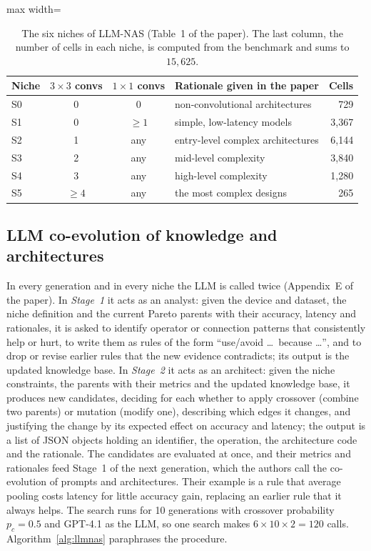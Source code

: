 \documentclass[preprint,12pt]{elsarticle}
\begin{document}
\begin{table}[h]\centering\small
\caption{The six niches of LLM-NAS (Table~1 of the paper). The last column, the number of cells in each niche, is computed from the benchmark and sums to $15{,}625$.}\label{tab:niches}
\begin{adjustbox}{max width=\linewidth}
\begin{tabular}{lccp{5.6cm}r}
\toprule
Niche & $3{\times}3$ convs & $1{\times}1$ convs & Rationale given in the paper & Cells \\
\midrule
S0 & 0 & 0 & non-convolutional architectures & 729 \\
S1 & 0 & $\ge1$ & simple, low-latency models & 3{,}367 \\
S2 & 1 & any & entry-level complex architectures & 6{,}144 \\
S3 & 2 & any & mid-level complexity & 3{,}840 \\
S4 & 3 & any & high-level complexity & 1{,}280 \\
S5 & $\ge4$ & any & the most complex designs & 265 \\
\bottomrule
\end{tabular}
\end{adjustbox}
\end{table}

\subsection{LLM co-evolution of knowledge and architectures}
In every generation and in every niche the LLM is called twice (Appendix~E of the paper). In \emph{Stage~1} it acts as an analyst: given the device and dataset, the niche definition and the current Pareto parents with their accuracy, latency and rationales, it is asked to identify operator or connection patterns that consistently help or hurt, to write them as rules of the form ``use/avoid \ldots\ because \ldots'', and to drop or revise earlier rules that the new evidence contradicts; its output is the updated knowledge base. In \emph{Stage~2} it acts as an architect: given the niche constraints, the parents with their metrics and the updated knowledge base, it produces new candidates, deciding for each whether to apply crossover (combine two parents) or mutation (modify one), describing which edges it changes, and justifying the change by its expected effect on accuracy and latency; the output is a list of JSON objects holding an identifier, the operation, the architecture code and the rationale. The candidates are evaluated at once, and their metrics and rationales feed Stage~1 of the next generation, which the authors call the co-evolution of prompts and architectures. Their example is a rule that average pooling costs latency for little accuracy gain, replacing an earlier rule that it always helps. The search runs for 10 generations with crossover probability $p_c=0.5$ and GPT-4.1 as the LLM, so one search makes $6\times10\times2=120$ calls. Algorithm~\ref{alg:llmnas} paraphrases the procedure.
\end{document}
